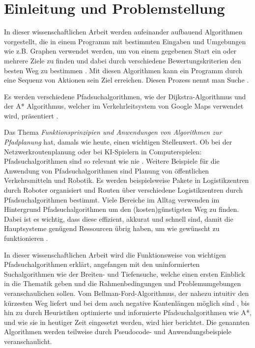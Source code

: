 \chapter{Einleitung und Problemstellung}
\label{Einleitung und Problemstellung}

In dieser wissenschaftlichen Arbeit werden aufeinander aufbauend Algorithmen vorgestellt, die in einem Programm mit bestimmten Eingaben und Umgebungen 
wie z.B. Graphen verwendet werden, um von einem gegebenen Start ein oder mehrere Ziele zu finden und dabei durch verschiedene Bewertungskriterien den besten Weg zu bestimmen \cite{Esri:00}.
Mit diesen Algorithmen kann ein Programm durch eine Sequenz von Aktionen sein Ziel erreichen. Diesen Prozess nennt man Suche \cite[108,109]{Russell:10}.

Es werden verschiedene Pfadsuchalgorithmen, wie der Dijkstra-Algorithmus und der A* Algorithmus, 
welcher im Verkehrleitsystem von Google Maps verwendet wird, präsentiert \cite{Mehta:19}. 

Das Thema \emph{Funktionsprinzipien und Anwendungen von Algorithmen zur Pfadplanung} hat, damals wie heute, einen wichtigen Stellenwert. 
Ob bei der Netzwerkroutenplanung oder bei KI-Spielern in Computerspielen: Pfadsuchalgorithmen sind so relevant wie nie \cite{Foeada:21}. 
Weitere Beispiele für die Anwendung von Pfadsuchalgorithmen sind Planung von öffentlichen Verkehrsmitteln und 
Robotik. Es werden beispielsweise Pakete in Logistikzentren durch Roboter organisiert und Routen über verschiedene Logistikzentren durch Pfadsuchalgorithmen bestimmt.
Viele Bereiche im Alltag verwenden im Hintergrund Pfadsuchalgorithmen um den (kosten)günstigsten Weg zu finden. Dabei ist es wichtig, 
dass diese effizient, akkurat und schnell sind, damit die Hauptsysteme genügend Ressourcen übrig haben, um wie gewünscht zu funktionieren \cite{Foeada:21}. 

In dieser wissenschaftlichen Arbeit wird die Funktionsweise von wichtigen Pfadsuchalgorithmen erklärt, angefangen mit den uninformierten Suchalgorithmen wie der Breiten- und Tiefensuche, 
welche einen ersten Einblick in die Thematik geben und die Rahmenbedingungen und Problemumgebungen veranschaulichen sollen. 
Vom Bellman-Ford-Algorithmus, der nahezu intuitiv den kürzesten Weg liefert und bei dem auch negative Kantenlängen möglich sind \cite{Mukhlif:20}, 
bis hin zu durch Heuristiken optimierte und informierte Pfadsuchalgorithmen wie A*, und wie sie in heutiger Zeit 
eingesetzt werden, wird hier berichtet. Die genannten Algorithmen werden teilweise durch Pseudocode- und Anwendungsbeispiele veranschaulicht.
